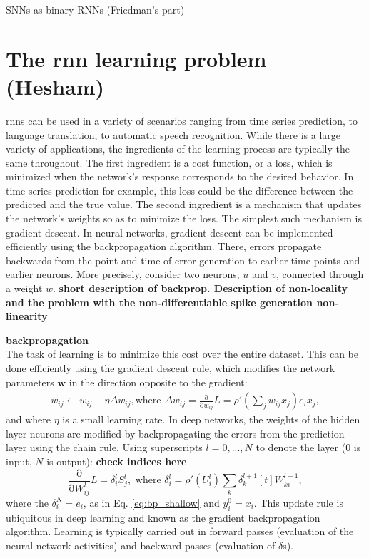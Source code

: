 \documentclass[journal,onecolumn,11pt]{IEEEtran}
\begin{document}
SNNs as binary RNNs (Friedman's part)

\section{The \gls{rnn} learning problem (Hesham)}
\glspl{rnn} can be used in a variety of scenarios ranging from time series prediction, to language translation, to automatic speech recognition. While there is a large variety of applications, the ingredients of the learning process are typically the same throughout. The first ingredient is a cost function, or a loss, which is minimized when the network's response corresponds to the desired behavior. In time series prediction for example, this loss could be the difference between the predicted and the true value. The second ingredient is a mechanism that updates the network's weights so as to minimize the loss. The simplest such mechanism is gradient descent. In neural networks, gradient descent can be implemented efficiently using the backpropagation algorithm.  There, errors propagate backwards from the point and time of error generation to earlier time points and earlier neurons. More precisely, consider two neurons, $u$ and $v$, connected through a weight $w$.
{\bf short description of backprop. Description of non-locality and the problem with the non-differentiable spike generation non-linearity}

{\bf backpropagation}\\
The task of learning is to minimize this cost over the entire dataset.
  This can be done efficiently using the gradient descent rule, which modifies the network parameters $\mathbf{w}$ in the direction opposite to the gradient:
  \begin{equation}\label{eq:bp_shallow}
    \begin{split}
      w_{ij} \leftarrow w_{ij} - \eta \Delta w_{ij},  \text{where } \Delta w_{ij} = \frac{\mathrm{\partial}}{\mathrm{\partial} w_{ij}} L = \rho'\left(\sum_j w_{ij} x_j\right) e_i x_j,
    \end{split}
  \end{equation}
  and where $\eta$ is a small learning rate. 
  In deep networks, the weights of the hidden layer neurons are modified by backpropagating the errors from the prediction layer using the chain rule. 
    Using superscripts $l=0,...,N$ to denote the layer ($0$ is input, $N$ is output):
  {\bf check indices here}
  \begin{equation}\label{eq:bp_deep}
    \frac{\mathrm{\partial}}{\mathrm{\partial} W^{l}_{ij}} L = \delta_{i}^{l}  S^{l}_j,\text{ where }\delta_{i}^{l} = \rho'\left( U_i^l \right) \sum_k \delta_{k}^{l+1}[t] W_{ki}^{l+1},
  \end{equation}
    where the $\delta_{i}^N=e_i$, as in Eq. \ref{eq:bp_shallow} and $y_{i}^0=x_i$.
  This update rule is ubiquitous in deep learning \cite{Rumelhart_etal88_paradist} and known as the gradient backpropagation algorithm.   
  Learning is typically carried out in forward passes (evaluation of the neural network activities) and backward passes (evaluation of $\delta$s).
\end{document}
